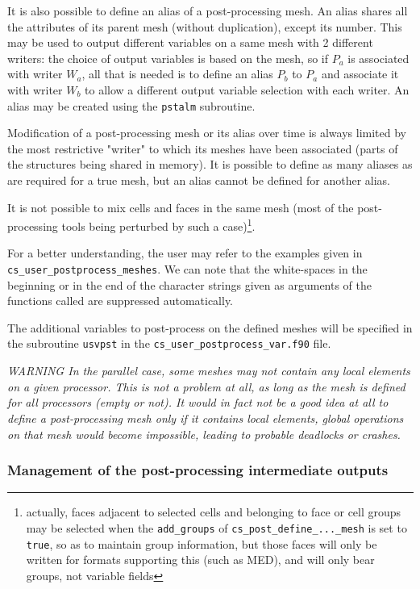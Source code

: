 {{{It is also possible to define an alias of a post-processing mesh. An
alias shares all the attributes of its parent mesh (without duplication),
except its number. This may be used to output different variables on a
same mesh with 2 different writers: the choice of output variables
is based on the mesh, so if $P_a$ is associated with writer $W_a$,
all that is needed is to define an alias $P_b$ to $P_a$ and associate
it with writer $W_b$ to allow a different output variable selection with
each writer. An alias may be created using the \texttt{pstalm} subroutine.

Modification of a post-processing mesh or its alias over time is always
limited by the most restrictive "writer" to which its meshes have been
associated (parts of the structures being shared in memory). It is
possible to define as many aliases as are required for a true mesh,
but an alias cannot be defined for another alias.

It is not possible to mix cells and faces in the same mesh (most of
the post-processing tools being perturbed by such a case)\footnote{actually,
faces adjacent to selected cells and belonging to face or cell groups
may be selected when the \texttt{add\_groups} of
\texttt{cs\_post\_define\_...\_mesh} is set to \texttt{true},
so as to maintain group information, but those faces will
only be written for formats supporting this (such as MED),
and will only bear groups, not variable fields}.

For a better understanding, the user may refer to the examples given in
\texttt{cs\_user\_postprocess\_meshes}. We can note that the white-spaces
in the beginning or in the end of the character strings given as arguments
of the functions called are suppressed automatically.

The additional variables to post-process on the defined meshes
will be specified in the subroutine \texttt{usvpst} in the
\texttt{cs\_user\_postprocess\_var.f90} file.

{\em WARNING In the parallel case, some meshes may not contain any
local elements on a given processor. This is not a problem at all, as
long as the mesh is defined for all processors (empty or not).
It would in fact not be a good idea at all to define a post-processing
mesh only if it contains local elements, global operations on that
mesh would become impossible, leading to probable deadlocks or crashes.}

\subsubsection{Management of the post-processing intermediate outputs}

}}}
